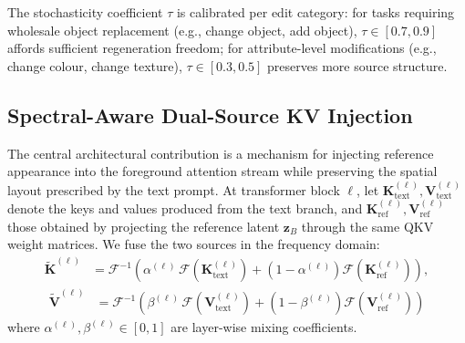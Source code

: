 The stochasticity coefficient $\tau$ is calibrated per edit category: for tasks requiring
wholesale object replacement (e.g., change object, add object),
$\tau \in [0.7, 0.9]$ affords sufficient regeneration freedom; for attribute-level
modifications (e.g., change colour, change texture),
$\tau \in [0.3, 0.5]$ preserves more source structure.

\subsection{Spectral-Aware Dual-Source KV Injection}

The central architectural contribution is a mechanism for injecting reference appearance into
the foreground attention stream while preserving the spatial layout prescribed by the text
prompt.
At transformer block $\ell$, let
$\mathbf{K}_{\text{text}}^{(\ell)}, \mathbf{V}_{\text{text}}^{(\ell)}$ denote the keys and
values produced from the text branch, and
$\mathbf{K}_{\text{ref}}^{(\ell)}, \mathbf{V}_{\text{ref}}^{(\ell)}$ those obtained by
projecting the reference latent $\mathbf{z}_B$ through the same QKV weight matrices.
We fuse the two sources in the frequency domain:
\begin{equation}
\begin{aligned}
    \tilde{\mathbf{K}}^{(\ell)}
        &= \mathcal{F}^{-1}\!\left(
              \alpha^{(\ell)}\,
              \mathcal{F}\!\left(\mathbf{K}_{\text{text}}^{(\ell)}\right)
            + \left(1 - \alpha^{(\ell)}\right)
              \mathcal{F}\!\left(\mathbf{K}_{\text{ref}}^{(\ell)}\right)
           \right),
\end{aligned}
\label{eq:fg_K}
\end{equation}
\begin{equation}
\begin{aligned}
    \tilde{\mathbf{V}}^{(\ell)}
        &= \mathcal{F}^{-1}\!\left(
              \beta^{(\ell)}\,
              \mathcal{F}\!\left(\mathbf{V}_{\text{text}}^{(\ell)}\right)
            + \left(1 - \beta^{(\ell)}\right)
              \mathcal{F}\!\left(\mathbf{V}_{\text{ref}}^{(\ell)}\right)
           \right)
\end{aligned}
\label{eq:fg_V}
\end{equation}
where $\alpha^{(\ell)}, \beta^{(\ell)} \in [0,1]$ are layer-wise mixing coefficients.

